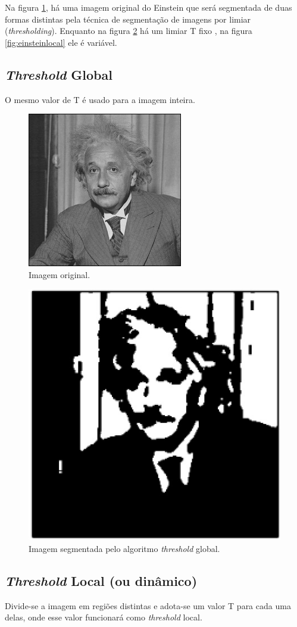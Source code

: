 Na figura \ref{fig:einstein}, há uma imagem original do Einstein que será segmentada de duas formas distintas pela técnica de segmentação de imagens por limiar (\textit{thresholding}). Enquanto na figura \ref{fig:einsteinglobal} há um limiar T fixo , na  figura \ref{fig:einsteinlocal} ele é variável.

\subsection{\textit{Threshold} Global}
O mesmo valor de T é usado para a imagem inteira.

  \begin{figure}[!htb]
       \begin{center}  
          \includegraphics[width=0.3\columnwidth]{img/einstein.jpg}
           \caption{\label{fig:einstein}Imagem original. \citep{stanford}}
       \end{center}
   \end{figure}

  \begin{figure}[!htb]
       \begin{center}  
          \includegraphics[width=0.3\columnwidth]{img/einstein-globalthresholding127.jpg}
           \caption{\label{fig:einsteinglobal}Imagem segmentada pelo algoritmo \textit{threshold} global.}
       \end{center}
   \end{figure}

\subsection{\textit{Threshold} Local (ou dinâmico)}
Divide-se a imagem em regiões distintas e adota-se um valor T para cada uma delas, onde esse valor funcionará como \textit{threshold} local. 

